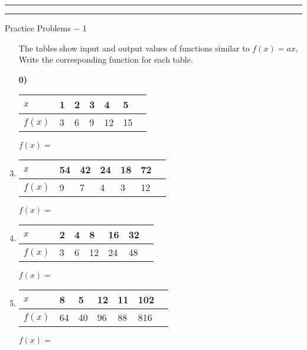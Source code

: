 \documentclass[11pt]{article}
\newcommand{\blank}[1]{\underline{\TextField[name=#1,align=1, bordercolor=, color=blue, width=2.5cm]{}}}
\begin{document}
\hrule\vspace{1mm}
\hrule
\begin{center}
\Large Practice Problems $-$ 1
\end{center}
\begin{enumerate}[label=\textbf{\arabic*)}]
\item[]The tables show input and output values of functions similar to $f(x)=ax$, Write the corresponding function for each table.
\item[\textbf{0)}] \begin{tabular}[t]{|P{1.5cm}||*{6}{P{6mm}|}}
\firsthline
$x$  & 1 & 2 & 3 & 4 & 5\\
\hline
$f(x)$ & 3 & 6 & 9 & 12 & 15\\
\hline
\end{tabular}\hspace{1cm}
$f(x)=\,\,${}\\

\item \begin{tabular}[t]{|P{1.5cm}||*{6}{P{6mm}|}}
\firsthline
$x$  & 54 & 42 & 24 & 18 & 72\\
\hline
$f(x)$ & 9 & 7 & 4 & 3 & 12\\
\hline
\end{tabular}\hspace{1cm}
$f(x)=\,\,$ \blank{q2a}\\

\item \begin{tabular}[t]{|P{1.5cm}||*{6}{P{6mm}|}}
\firsthline
$x$  & 2 & 4 & 8 & 16 & 32\\
\hline
$f(x)$ & 3 & 6 & 12 & 24 & 48\\
\hline
\end{tabular}\hspace{1cm}
$f(x)=\,\,$ \blank{q3a}\\

\item \begin{tabular}[t]{|P{1.5cm}||*{6}{P{6mm}|}}
\firsthline
$x$  & 8 & 5 & 12 & 11 & 102\\
\hline
$f(x)$ & 64 & 40 & 96 & 88 & 816\\
\hline
\end{tabular}\hspace{1cm}
$f(x)=\,$ \blank{q4a}\\\\



\end{enumerate}
\end{document}
